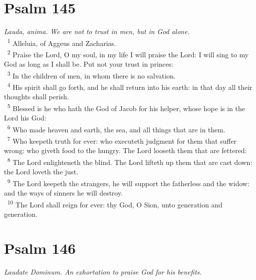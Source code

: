 \documentclass[a5paper,12pt]{article}
\begin{document}
\begin{multicols*}{2}
\section{Psalm 145}
\label{sec:org5fef807}
\emph{Lauda, anima. We are not to trust in men, but in God alone.}\\

~\textsuperscript{1} Alleluia, of Aggeus and Zacharias.\\
~\textsuperscript{2} Praise the Lord, O my soul, in my life I will praise the Lord: I will sing to my God as long as I shall be. Put not your trust in princes:\\
~\textsuperscript{3} In the children of men, in whom there is no salvation.\\
~\textsuperscript{4} His spirit shall go forth, and he shall return into his earth: in that day all their thoughts shall perish.\\
~\textsuperscript{5} Blessed is he who hath the God of Jacob for his helper, whose hope is in the Lord his God:\\
~\textsuperscript{6} Who made heaven and earth, the sea, and all things that are in them.\\
~\textsuperscript{7} Who keepeth truth for ever: who executeth judgment for them that suffer wrong: who giveth food to the hungry. The Lord looseth them that are fettered:\\
~\textsuperscript{8} The Lord enlighteneth the blind. The Lord lifteth up them that are cast down: the Lord loveth the just.\\
~\textsuperscript{9} The Lord keepeth the strangers, he will support the fatherless and the widow: and the ways of sinners he will destroy.\\
~\textsuperscript{10} The Lord shall reign for ever: thy God, O Sion, unto generation and generation.\\

\section{Psalm 146}
\label{sec:org86b4ea4}
\emph{Laudate Dominum. An exhortation to praise God for his benefits.}\\


\end{multicols*}
\end{document}
